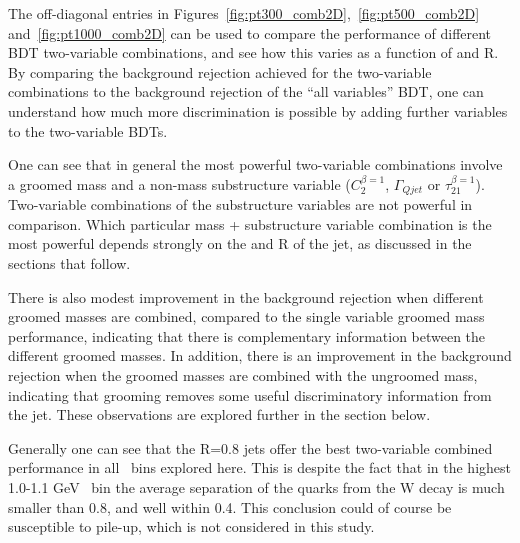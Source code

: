 The off-diagonal entries in Figures~\ref{fig:pt300_comb2D},~\ref{fig:pt500_comb2D}
and~\ref{fig:pt1000_comb2D} can be used to compare the performance
of different BDT two-variable combinations, and see how this varies as
a function of \pt and R. By comparing the background rejection
achieved for the two-variable combinations to the background rejection
of the ``all variables'' BDT, one can understand how much more
discrimination is possible by adding further variables to the
two-variable BDTs.

One can see that in general the most powerful two-variable
combinations involve a groomed mass and a non-mass substructure
variable ($C_2^{\beta=1}$, $\Gamma_{Qjet}$ or
$\tau_{21}^{\beta=1}$). Two-variable combinations of the substructure
variables are not powerful in comparison.  Which particular mass +
substructure variable combination is the most
powerful depends strongly on the \pt and R of the jet, as discussed
in the sections that follow. 


There is also modest improvement in
the background rejection when different groomed masses are combined,
compared to the single variable groomed mass performance, indicating that there is complementary information between the
different groomed masses. In addition, there is an improvement in the
background rejection when the groomed masses are combined with the
ungroomed mass, indicating that grooming removes some useful
discriminatory information from the jet. These observations are
explored further in the section below.

Generally one can see that the R=0.8 jets offer the best two-variable
combined performance in all \pt~bins explored here. This is despite
the fact that in the highest 1.0-1.1 GeV \pt~bin the average
separation of the quarks from the W decay is much smaller than 0.8,
and well within 0.4. This conclusion could of course be susceptible to
pile-up, which is not considered in this study.

